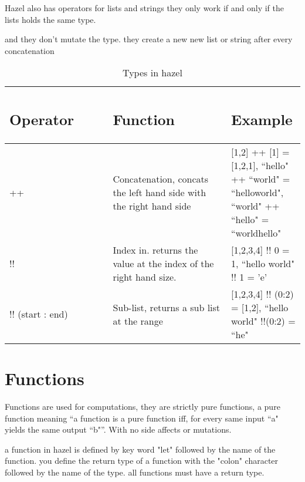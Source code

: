 \documentclass{article}
\begin{document}
Hazel also has operators for lists and strings 
they only work if and only if the lists holds the same type. 

and they don't mutate the type. they create a new new list or string after every concatenation

\begin{table}[H]
    \centering
    \begin{tabular}{p{0.35\linewidth} | p{0.4\linewidth}| p{0.4\linewidth} | }
      
\subsection*{Operator} & \subsection*{Function} & \subsection*{Example}
 \\ \hline
      ++ & Concatenation, concats the left hand side with the right hand side & [1,2] ++ [1] = [1,2,1], ``hello" ++ ``world" = ``helloworld", ``world" ++ ``hello" =  ``worldhello" \\ \hline
      !! & Index in. returns the value at the index of the right hand size.  &  [1,2,3,4] !! 0 = 1, ``hello world" !! 1 = 'e' \\ \hline
      !! (start : end) & Sub-list, returns a sub list at the range  & [1,2,3,4] !! (0:2) = [1,2], ``hello world" !!(0:2) = ``he" \\ \hline      
    \end{tabular}
        \caption{Types in hazel}
\end{table}

\section{Functions}

Functions are used for computations, they are strictly pure functions, a pure function meaning ``a function is a pure function iff, for every same input ``a" yields the same output ``b"”. With no side affects or mutations.

a function in hazel is defined by key word "let" followed by the name of the function.  
you define the return type of a function with the "colon" character followed by the name of the type.
all functions must have a return type. 
\end{document}

